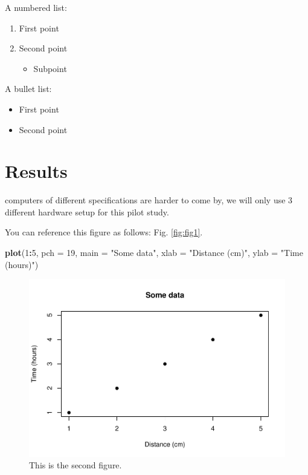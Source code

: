 \documentclass[12pt,halfline,a4paper,]{ouparticle}
\newenvironment{Shaded}{\begin{snugshade}}{\end{snugshade}}
\newcommand{\AttributeTok}[1]{\textcolor[rgb]{0.13,0.29,0.53}{#1}}
\newcommand{\DecValTok}[1]{\textcolor[rgb]{0.00,0.00,0.81}{#1}}
\newcommand{\FunctionTok}[1]{\textcolor[rgb]{0.13,0.29,0.53}{\textbf{#1}}}
\newcommand{\NormalTok}[1]{#1}
\newcommand{\SpecialCharTok}[1]{\textcolor[rgb]{0.81,0.36,0.00}{\textbf{#1}}}
\newcommand{\StringTok}[1]{\textcolor[rgb]{0.31,0.60,0.02}{#1}}
\providecommand{\tightlist}{%
  \setlength{\itemsep}{0pt}\setlength{\parskip}{0pt}}
\begin{document}
A numbered list:

\begin{enumerate}
\def\labelenumi{\arabic{enumi})}
\tightlist
\item
  First point
\item
  Second point

  \begin{itemize}
  \tightlist
  \item
    Subpoint
  \end{itemize}
\end{enumerate}

A bullet list:

\begin{itemize}
\tightlist
\item
  First point
\item
  Second point
\end{itemize}

\section{Results}\label{results}

computers of different specifications are harder to come by, we will
only use 3 different hardware setup for this pilot study.

You can reference this figure as follows: Fig. \ref{fig:fig1}.

\begin{Shaded}
\begin{Highlighting}[]
\FunctionTok{plot}\NormalTok{(}\DecValTok{1}\SpecialCharTok{:}\DecValTok{5}\NormalTok{, }\AttributeTok{pch =} \DecValTok{19}\NormalTok{, }\AttributeTok{main =} \StringTok{"Some data"}\NormalTok{, }\AttributeTok{xlab =} \StringTok{"Distance (cm)"}\NormalTok{, }\AttributeTok{ylab =} \StringTok{"Time (hours)"}\NormalTok{)}
\end{Highlighting}
\end{Shaded}

\begin{figure}[p]
\includegraphics[width=1\linewidth]{skeleton_files/figure-latex/fig2-1} \caption{This is the second figure.}\label{fig:fig2}
\end{figure}
\end{document}
